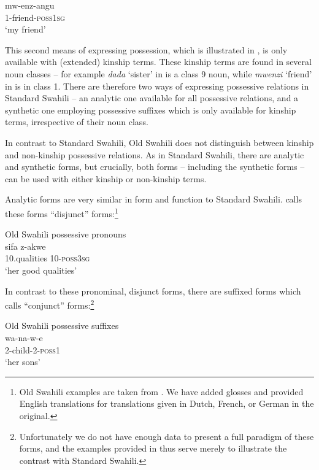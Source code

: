 \documentclass[output=paper]{langscibook}
\begin{document}
\ex\label{ex:marten:4b} \gll  mw-enz-angu\\
  1-friend-\textsc{poss1sg}\\
   \glt ‘my friend’
   \z
\z

This second means of expressing possession, which is illustrated in , is only available with (extended) kinship terms. These kinship terms are found in several noun classes -- for example \textit{dada} ‘sister’ in  is a class 9 noun, while \textit{mwenzi} ‘friend’ in  is in class 1. There are therefore two ways of expressing possessive relations in Standard Swahili -- an analytic one available for all possessive relations, and a synthetic one employing possessive suffixes which is only available for kinship terms, irrespective of their noun class.

In contrast to Standard Swahili, Old Swahili does not distinguish between kinship and non-kinship possessive relations. As in Standard Swahili, there are analytic and synthetic forms, but crucially, both forms -- including the synthetic forms -- can be used with either kinship or non-kinship terms.

Analytic forms are very similar in form and function to Standard Swahili. \citet[166]{Miehe1979} calls these forms ``disjunct'' forms:\footnote{Old Swahili examples are taken from \citet{Miehe1979}. We have added glosses and provided English translations for translations given in Dutch, French, or German in the original.} 

\ea\label{ex:marten:5}
Old Swahili possessive pronouns\\
\gll sifa         z-akwe \\
10.qualities    10-\textsc{poss3sg}\\
\glt ‘her good qualities’ \citep[166]{Miehe1979}
\z

In contrast to these pronominal, disjunct forms, there are suffixed forms which \citet[159]{Miehe1979} calls ``conjunct'' forms:\footnote{Unfortunately we do not have enough data to present a full paradigm of these forms, and the examples provided in  thus serve merely to illustrate the contrast with Standard Swahili.} 

\ea\label{ex:marten:6}
Old Swahili possessive suffixes\\
    \ea\label{ex:marten:6a} \gll wa-na-w-e \\
    2-child-2-\textsc{poss1}\\
    \glt ‘her sons’ \citep[162]{Miehe1979}
    
\end{document}
